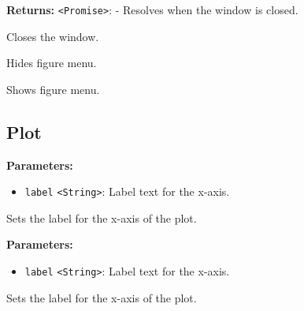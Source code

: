 \documentclass[12pt,a4paper]{article}
\begin{document}
\noindent \textbf{Returns:} \texttt{<Promise>}: - Resolves when the window is closed.

\noindent Closes the window.

\vspace{5mm}
\noindent {}


\noindent Hides figure menu.

\vspace{5mm}
\noindent {}


\noindent Shows figure menu.


\subsection{Plot}
\vspace{5mm}
\noindent {}


\noindent \textbf{Parameters:}
\begin{itemize}
  \item \texttt{label} \texttt{<String>}: Label text for the x-axis.
\end{itemize}

\noindent Sets the label for the x-axis of the plot.

\vspace{5mm}
\noindent {}


\noindent \textbf{Parameters:}
\begin{itemize}
  \item \texttt{label} \texttt{<String>}: Label text for the x-axis.
\end{itemize}

\noindent Sets the label for the x-axis of the plot.

\vspace{5mm}
\noindent {}
\end{document}

